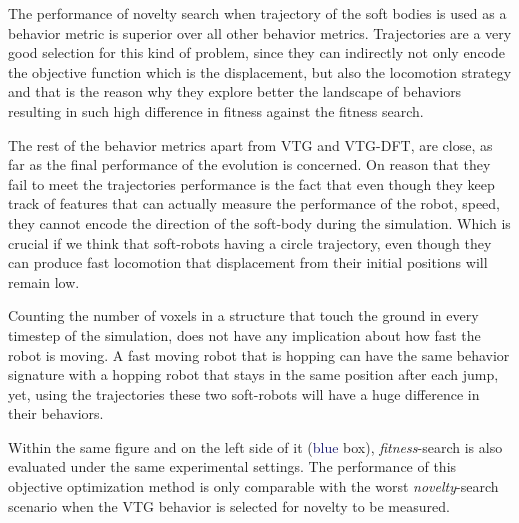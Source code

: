 The performance of novelty search when trajectory of the soft bodies is used as a behavior metric is superior over all other behavior metrics. Trajectories are a very good selection for this kind of problem, since they can indirectly not only encode the objective function which is the displacement, but also the locomotion strategy and that is the reason why they explore better the landscape of behaviors resulting in such high difference in fitness against the fitness search. 

The rest of the behavior metrics apart from VTG and VTG-DFT, are close, as far as the final performance of the evolution is concerned. On reason that they fail to meet the trajectories performance is the fact that even though they keep track of features that can actually measure the performance of the robot, speed, they cannot encode the direction of the soft-body during the simulation. Which is crucial if we think that soft-robots having a circle trajectory, even though they can produce fast locomotion that displacement from their initial positions will remain low.

Counting the number of voxels in a structure that touch the ground in every timestep of the simulation, does not have any implication about how fast the robot is moving. A fast moving robot that is hopping can have the same behavior signature with a hopping robot that stays in the same position after each jump, yet, using the trajectories these two soft-robots will have a huge difference in their behaviors.

Within the same figure and on the left side of it (\textcolor{MidnightBlue}{blue} box), \emph{fitness}-search is also evaluated under the same experimental settings. The performance of this objective optimization method is only comparable with the worst \emph{novelty}-search scenario when the VTG behavior is selected for novelty to be measured.

